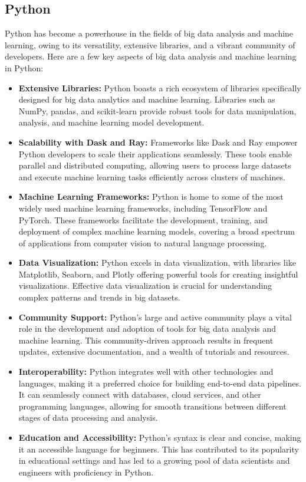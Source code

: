 \documentclass[conference]{IEEEtran}
\begin{document}
\subsection{Python\cite{b3,b4}}
Python has become a powerhouse in the fields of big data analysis and machine learning, owing to its versatility, extensive libraries, and a vibrant community of developers. Here are a few key aspects of big data analysis and machine learning in Python:
\begin{itemize}
\item \textbf{Extensive Libraries:} Python boasts a rich ecosystem of libraries specifically designed for big data analytics and machine learning. Libraries such as NumPy, pandas, and scikit-learn provide robust tools for data manipulation, analysis, and machine learning model development.
\item \textbf{Scalability with Dask and Ray:} Frameworks like Dask and Ray empower Python developers to scale their applications seamlessly. These tools enable parallel and distributed computing, allowing users to process large datasets and execute machine learning tasks efficiently across clusters of machines.
\item \textbf{Machine Learning Frameworks:} Python is home to some of the most widely used machine learning frameworks, including TensorFlow and PyTorch. These frameworks facilitate the development, training, and deployment of complex machine learning models, covering a broad spectrum of applications from computer vision to natural language processing.
\item \textbf{Data Visualization:} Python excels in data visualization, with libraries like Matplotlib, Seaborn, and Plotly offering powerful tools for creating insightful visualizations. Effective data visualization is crucial for understanding complex patterns and trends in big datasets.
\item \textbf{Community Support:} Python's large and active community plays a vital role in the development and adoption of tools for big data analysis and machine learning. This community-driven approach results in frequent updates, extensive documentation, and a wealth of tutorials and resources.
\item \textbf{Interoperability:} Python integrates well with other technologies and languages, making it a preferred choice for building end-to-end data pipelines. It can seamlessly connect with databases, cloud services, and other programming languages, allowing for smooth transitions between different stages of data processing and analysis.
\item \textbf{Education and Accessibility:} Python's syntax is clear and concise, making it an accessible language for beginners. This has contributed to its popularity in educational settings and has led to a growing pool of data scientists and engineers with proficiency in Python.
\end{itemize}
\end{document}
